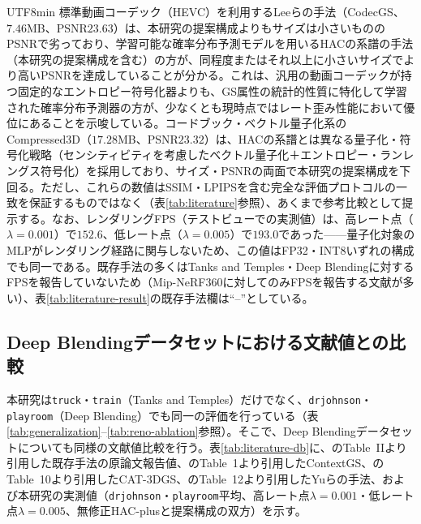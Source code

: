 \documentclass{ieeeaccess}
\begin{document}
\begin{CJK}{UTF8}{min}
標準動画コーデック（HEVC）を利用するLeeらの手法（CodecGS、$7.46$MB、PSNR$23.63$）は、本研究の提案構成よりもサイズは小さいもののPSNRで劣っており、学習可能な確率分布予測モデルを用いるHACの系譜の手法（本研究の提案構成を含む）の方が、同程度またはそれ以上に小さいサイズでより高いPSNRを達成していることが分かる。これは、汎用の動画コーデックが持つ固定的なエントロピー符号化器よりも、GS属性の統計的性質に特化して学習された確率分布予測器の方が、少なくとも現時点ではレート歪み性能において優位にあることを示唆している。コードブック・ベクトル量子化系のCompressed3D（$17.28$MB、PSNR$23.32$）は、HACの系譜とは異なる量子化・符号化戦略（センシティビティを考慮したベクトル量子化＋エントロピー・ランレングス符号化）を採用しており、サイズ・PSNRの両面で本研究の提案構成を下回る。ただし、これらの数値はSSIM・LPIPSを含む完全な評価プロトコルの一致を保証するものではなく（表\ref{tab:literature}参照）、あくまで参考比較として提示する。なお、レンダリングFPS（テストビューでの実測値）は、高レート点（$\lambda=0.001$）で$152.6$、低レート点（$\lambda=0.005$）で$193.0$であった——量子化対象のMLPがレンダリング経路に関与しないため、この値はFP32・INT8いずれの構成でも同一である。既存手法の多くはTanks and Temples・Deep Blendingに対するFPSを報告していないため（Mip-NeRF360に対してのみFPSを報告する文献が多い）、表\ref{tab:literature-result}の既存手法欄は“--”としている。

\subsection{Deep Blendingデータセットにおける文献値との比較}
本研究は\texttt{truck}・\texttt{train}（Tanks and Temples）だけでなく、\texttt{drjohnson}・\texttt{playroom}（Deep Blending）でも同一の評価を行っている（表\ref{tab:generalization}--\ref{tab:reno-ablation}参照）。そこで、Deep Blendingデータセットについても同様の文献値比較を行う。表\ref{tab:literature-db}に、\cite{chen2025hacpp}のTable~IIより引用した既存手法の原論文報告値、\cite{wang2024contextgs}のTable~1より引用したContextGS、\cite{zhan2025cat3dgs}のTable~10より引用したCAT-3DGS、\cite{yu2026practical}のTable~12より引用したYuらの手法、および本研究の実測値（\texttt{drjohnson}・\texttt{playroom}平均、高レート点$\lambda=0.001$・低レート点$\lambda=0.005$、無修正HAC-plusと提案構成の双方）を示す。


\end{CJK}
\end{document}
